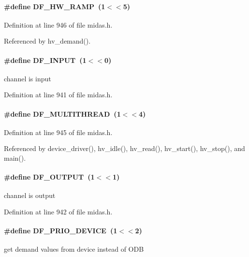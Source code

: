 \paragraph[{DF\_\-HW\_\-RAMP}]{\setlength{\rightskip}{0pt plus 5cm}\#define DF\_\-HW\_\-RAMP~(1$<$$<$5)}\hfill\label{group__mequipment_ga2bc66eaec0c3f864e8e3fb89992857d5}


Definition at line 946 of file midas.h.

Referenced by hv\_\-demand().
\paragraph[{DF\_\-INPUT}]{\setlength{\rightskip}{0pt plus 5cm}\#define DF\_\-INPUT~(1$<$$<$0)}\hfill\label{group__mequipment_gace7257be62c3d56a883e4ad1dff6fdda}
channel is input 

Definition at line 941 of file midas.h.
\paragraph[{DF\_\-MULTITHREAD}]{\setlength{\rightskip}{0pt plus 5cm}\#define DF\_\-MULTITHREAD~(1$<$$<$4)}\hfill\label{group__mequipment_ga2499f0abd1f0577de72d1d5645fc7713}


Definition at line 945 of file midas.h.

Referenced by device\_\-driver(), hv\_\-idle(), hv\_\-read(), hv\_\-start(), hv\_\-stop(), and main().
\paragraph[{DF\_\-OUTPUT}]{\setlength{\rightskip}{0pt plus 5cm}\#define DF\_\-OUTPUT~(1$<$$<$1)}\hfill\label{group__mequipment_ga9a302762256e89a266256dcadd31b90b}
channel is output 

Definition at line 942 of file midas.h.
\paragraph[{DF\_\-PRIO\_\-DEVICE}]{\setlength{\rightskip}{0pt plus 5cm}\#define DF\_\-PRIO\_\-DEVICE~(1$<$$<$2)}\hfill\label{group__mequipment_ga14cf699d29a6edd2088b83e17cda6744}
get demand values from device instead of ODB 

